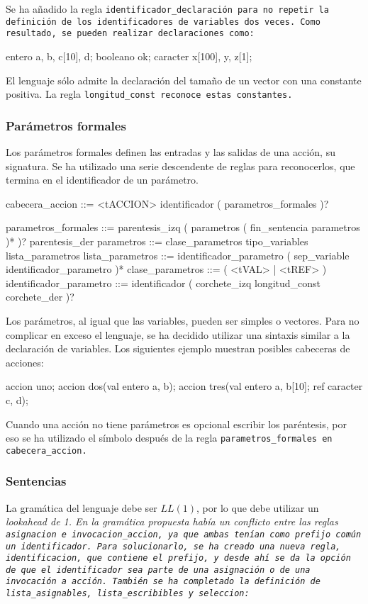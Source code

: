 Se ha añadido la regla \tt{identificador\_declaración} para no repetir la definición de los identificadores de variables dos veces. Como resultado, se pueden realizar declaraciones como:

\begin{codigo}
entero a, b, c[10], d;
booleano ok;
caracter x[100], y, z[1];
\end{codigo}

El lenguaje sólo admite la declaración del tamaño de un vector con una constante positiva. La regla \tt{longitud\_const} reconoce estas constantes.

\subsubsection{Parámetros formales}
Los parámetros formales definen las entradas y las salidas de una acción, su signatura. Se ha utilizado una serie descendente de reglas para reconocerlos, que termina en el identificador de un parámetro.

\begin{codigo}
cabecera_accion	::=	<tACCION> identificador ( parametros_formales )?

parametros_formales ::= parentesis_izq ( parametros ( fin_sentencia parametros )* )? parentesis_der
parametros ::= clase_parametros tipo_variables lista_parametros
lista_parametros ::= identificador_parametro ( sep_variable identificador_parametro )*
clase_parametros ::= ( <tVAL> | <tREF> )
identificador_parametro ::= identificador ( corchete_izq longitud_const corchete_der )?
\end{codigo}

Los parámetros, al igual que las variables, pueden ser simples o vectores. Para no complicar en exceso el lenguaje, se ha decidido utilizar una sintaxis similar a la declaración de variables. Los siguientes ejemplo muestran posibles cabeceras de acciones:

\begin{codigo}
accion uno;
accion dos(val entero a, b);
accion tres(val entero a, b[10]; ref caracter c, d);
\end{codigo}


Cuando una acción no tiene parámetros es opcional escribir los paréntesis, por eso se ha utilizado el símbolo  después de la regla \tt{parametros\_formales} en \tt{cabecera\_accion}.

\subsubsection{Sentencias}
La gramática del lenguaje debe ser $LL(1)$, por lo que debe utilizar un \it{lookahead} de 1. En la gramática propuesta había un conflicto entre las reglas \tt{asignacion} e \tt{invocacion\_accion}, ya que ambas tenían como prefijo común un identificador. Para solucionarlo, se ha creado una nueva regla, \tt{identificacion}, que contiene el prefijo, y desde ahí se da la opción de que el identificador sea parte de una asignación o de una invocación a acción. También se ha completado la definición de \tt{lista\_asignables}, \tt{lista\_escribibles} y \tt{seleccion}:

